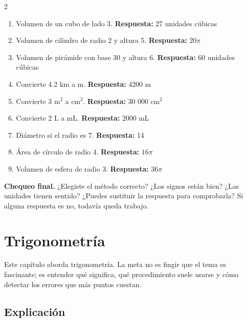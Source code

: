 \documentclass[10pt,oneside,openany]{book}
\begin{document}
\begin{multicols}{2}\begin{enumerate}

\item Volumen de un cubo de lado 3. \textbf{Respuesta:} 27 unidades cúbicas

\item Volumen de cilindro de radio 2 y altura 5. \textbf{Respuesta:} $20\pi$

\item Volumen de pirámide con base 30 y altura 6. \textbf{Respuesta:} 60 unidades cúbicas

\item Convierte 4.2 km a m. \textbf{Respuesta:} 4200 m

\item Convierte 3 m$^2$ a cm$^2$. \textbf{Respuesta:} 30 000 cm$^2$

\item Convierte 2 L a mL. \textbf{Respuesta:} 2000 mL

\item Diámetro si el radio es 7. \textbf{Respuesta:} 14

\item Área de círculo de radio 4. \textbf{Respuesta:} $16\pi$

\item Volumen de esfera de radio 3. \textbf{Respuesta:} $36\pi$

\end{enumerate}\end{multicols}

\begin{idea}\textbf{Chequeo final.} ¿Elegiste el método correcto? ¿Los signos están bien? ¿Las unidades tienen sentido? ¿Puedes sustituir la respuesta para comprobarla? Si alguna respuesta es no, todavía queda trabajo.\end{idea}



\chapter{Trigonometría}

\begin{idea}
Este capítulo aborda trigonometría. La meta no es fingir que el tema es fascinante; es entender qué significa, qué procedimiento suele usarse y cómo detectar los errores que más puntos cuestan.
\end{idea}

\section{Explicación}
\end{document}
